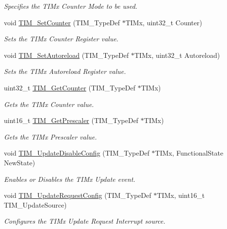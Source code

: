 \begin{DoxyCompactItemize}
\begin{DoxyCompactList}\small\item\em Specifies the T\-I\-Mx Counter Mode to be used. \end{DoxyCompactList}\item 
void \hyperlink{group___t_i_m_ga18173e7955a85d5c2598c643eada2692}{T\-I\-M\-\_\-\-Set\-Counter} (T\-I\-M\-\_\-\-Type\-Def $\ast$T\-I\-Mx, uint32\-\_\-t Counter)
\begin{DoxyCompactList}\small\item\em Sets the T\-I\-Mx Counter Register value. \end{DoxyCompactList}\item 
void \hyperlink{group___t_i_m_gad6a388d498c7f299d00a9d0871943041}{T\-I\-M\-\_\-\-Set\-Autoreload} (T\-I\-M\-\_\-\-Type\-Def $\ast$T\-I\-Mx, uint32\-\_\-t Autoreload)
\begin{DoxyCompactList}\small\item\em Sets the T\-I\-Mx Autoreload Register value. \end{DoxyCompactList}\item 
uint32\-\_\-t \hyperlink{group___t_i_m_ga53607976e0866ab424e294cda9f6036e}{T\-I\-M\-\_\-\-Get\-Counter} (T\-I\-M\-\_\-\-Type\-Def $\ast$T\-I\-Mx)
\begin{DoxyCompactList}\small\item\em Gets the T\-I\-Mx Counter value. \end{DoxyCompactList}\item 
uint16\-\_\-t \hyperlink{group___t_i_m_ga427eb6e533480e02a27cd0ca876183d6}{T\-I\-M\-\_\-\-Get\-Prescaler} (T\-I\-M\-\_\-\-Type\-Def $\ast$T\-I\-Mx)
\begin{DoxyCompactList}\small\item\em Gets the T\-I\-Mx Prescaler value. \end{DoxyCompactList}\item 
void \hyperlink{group___t_i_m_gace2384dd33e849a054f61b8e1fc7e7c3}{T\-I\-M\-\_\-\-Update\-Disable\-Config} (T\-I\-M\-\_\-\-Type\-Def $\ast$T\-I\-Mx, Functional\-State New\-State)
\begin{DoxyCompactList}\small\item\em Enables or Disables the T\-I\-Mx Update event. \end{DoxyCompactList}\item 
void \hyperlink{group___t_i_m_ga1d7a8f952e209de142499e67a653fc1f}{T\-I\-M\-\_\-\-Update\-Request\-Config} (T\-I\-M\-\_\-\-Type\-Def $\ast$T\-I\-Mx, uint16\-\_\-t T\-I\-M\-\_\-\-Update\-Source)
\begin{DoxyCompactList}\small\item\em Configures the T\-I\-Mx Update Request Interrupt source. \end{DoxyCompactList}\item 

\end{DoxyCompactItemize}
